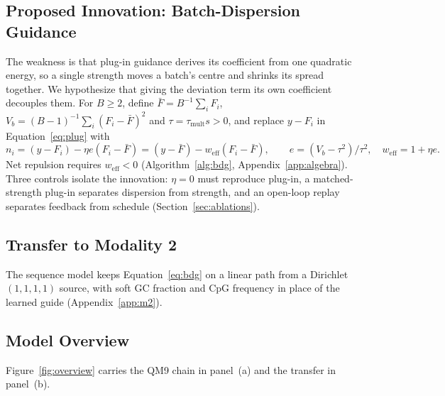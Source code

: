 \documentclass{article}
\newcommand{\Fbar}{\bar F}
\newcommand{\Vb}{V_b}
\newcommand{\weff}{w_{\mathrm{eff}}}
\begin{document}
\subsection{Proposed Innovation: Batch-Dispersion Guidance}\label{sec:bdg}
The weakness is that plug-in guidance derives its coefficient from one quadratic energy, so a single strength moves a batch's centre and shrinks its spread together. We hypothesize that giving the deviation term its own coefficient decouples them. For $B\ge2$, define $\Fbar=B^{-1}\sum_iF_i$, $\Vb=(B-1)^{-1}\sum_i(F_i-\Fbar)^2$ and $\tau=\tau_{\mathrm{mult}}s>0$, and replace $y-F_i$ in Equation~\eqref{eq:plug} with
\begin{equation}
n_i=(y-F_i)-\eta e(F_i-\Fbar)=(y-\Fbar)-\weff(F_i-\Fbar),\qquad
e=(\Vb-\tau^2)/\tau^2,\quad \weff=1+\eta e.
\label{eq:bdg}
\end{equation}
Net repulsion requires $\weff<0$ (Algorithm~\ref{alg:bdg}, Appendix~\ref{app:algebra}). Three controls isolate the innovation: $\eta=0$ must reproduce plug-in, a matched-strength plug-in separates dispersion from strength, and an open-loop replay separates feedback from schedule (Section~\ref{sec:ablations}).

\subsection{Transfer to Modality 2}\label{sec:transfer}
The sequence model keeps Equation~\eqref{eq:bdg} on a linear path from a Dirichlet$(1,1,1,1)$ source, with soft GC fraction and CpG frequency in place of the learned guide (Appendix~\ref{app:m2}).

\subsection{Model Overview}\label{sec:overview}
Figure~\ref{fig:overview} carries the QM9 chain in panel~(a) and the transfer in panel~(b).
\end{document}
